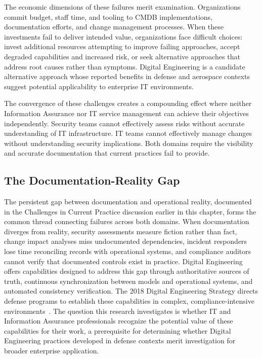 The economic dimensions of these failures merit examination. Organizations commit budget, staff time, and tooling to CMDB implementations, documentation efforts, and change management processes.
When these investments fail to deliver intended value, organizations face difficult choices: invest additional resources attempting to improve failing approaches, accept degraded capabilities and increased risk, or seek alternative approaches that address root causes rather than symptoms. Digital Engineering is a candidate alternative approach whose reported benefits in defense and aerospace contexts suggest potential applicability to enterprise IT environments.

The convergence of these challenges creates a compounding effect where neither Information Assurance nor IT service management can achieve their objectives independently. Security teams cannot effectively assess risks without accurate understanding of IT infrastructure. IT teams cannot effectively manage changes without understanding security implications. Both domains require the visibility and accurate documentation that current practices fail to provide.

\subsection{The Documentation-Reality Gap}

The persistent gap between documentation and operational reality, documented in the Challenges in Current Practice discussion earlier in this chapter, forms the common thread connecting failures across both domains. When documentation diverges from reality, security assessments measure fiction rather than fact, change impact analyses miss undocumented dependencies, incident responders lose time reconciling records with operational systems, and compliance auditors cannot verify that documented controls exist in practice. Digital Engineering offers capabilities designed to address this gap through authoritative sources of truth, continuous synchronization between models and operational systems, and automated consistency verification. The 2018 Digital Engineering Strategy directs defense programs to establish these capabilities in complex, compliance-intensive environments~\parencite{DoD_DE_Strategy_2018}. The question this research investigates is whether IT and Information Assurance professionals recognize the potential value of these capabilities for their work, a prerequisite for determining whether Digital Engineering practices developed in defense contexts merit investigation for broader enterprise application.

